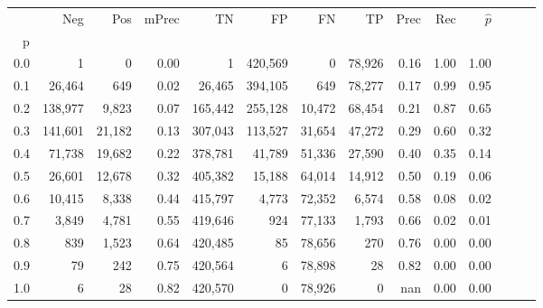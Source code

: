 \begin{tabular}{rrrrrrrrrrrrrr}
\toprule
{} &      Neg &     Pos & mPrec &       TN &       FP &      FN &      TP &  Prec &   Rec & $\hat{p}$ \\
p   &          &         &       &          &          &         &         &       &       &           \\
\midrule
0.0 &        1 &       0 &  0.00 &        1 &  420,569 &       0 &  78,926 &  0.16 &  1.00 &      1.00 \\
0.1 &   26,464 &     649 &  0.02 &   26,465 &  394,105 &     649 &  78,277 &  0.17 &  0.99 &      0.95 \\
0.2 &  138,977 &   9,823 &  0.07 &  165,442 &  255,128 &  10,472 &  68,454 &  0.21 &  0.87 &      0.65 \\
0.3 &  141,601 &  21,182 &  0.13 &  307,043 &  113,527 &  31,654 &  47,272 &  0.29 &  0.60 &      0.32 \\
0.4 &   71,738 &  19,682 &  0.22 &  378,781 &   41,789 &  51,336 &  27,590 &  0.40 &  0.35 &      0.14 \\
0.5 &   26,601 &  12,678 &  0.32 &  405,382 &   15,188 &  64,014 &  14,912 &  0.50 &  0.19 &      0.06 \\
0.6 &   10,415 &   8,338 &  0.44 &  415,797 &    4,773 &  72,352 &   6,574 &  0.58 &  0.08 &      0.02 \\
0.7 &    3,849 &   4,781 &  0.55 &  419,646 &      924 &  77,133 &   1,793 &  0.66 &  0.02 &      0.01 \\
0.8 &      839 &   1,523 &  0.64 &  420,485 &       85 &  78,656 &     270 &  0.76 &  0.00 &      0.00 \\
0.9 &       79 &     242 &  0.75 &  420,564 &        6 &  78,898 &      28 &  0.82 &  0.00 &      0.00 \\
1.0 &        6 &      28 &  0.82 &  420,570 &        0 &  78,926 &       0 &   nan &  0.00 &      0.00 \\
\bottomrule
\end{tabular}
